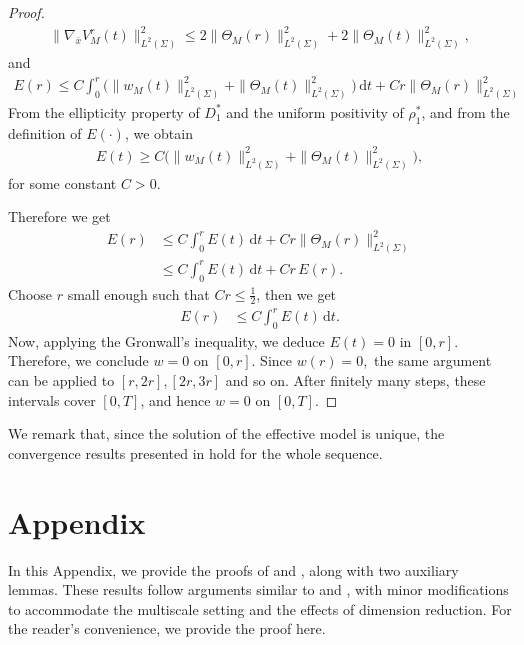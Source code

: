 \documentclass[11pt]{article}
\newcommand{\di}[1]{\,\mathrm{d}#1}
\begin{document}
\begin{proof}
\begin{align*}
    \|\nabla_{\bar x}V_M^r(t)\|_{L^2(\Sigma)}^2\leq 2\|\Theta_M(r)\|_{L^2(\Sigma)}^2+2\|\Theta_M(t)\|_{L^2(\Sigma)}^2,
\end{align*}
and 
\begin{align*}
    E(r)\leq C \int_0^r\Big(\|w_M(t)\|_{L^2(\Sigma)}^2+\|\Theta_M(t)\|_{L^2(\Sigma)}^2\Big)\di{t}+Cr\|\Theta_M(r)\|_{L^2(\Sigma)}^2
\end{align*}
From the ellipticity property of $D_1^*$ and the uniform positivity of $\rho_1^*$, and from the definition of $E(\cdot)$, we obtain
\begin{align*}
    E(t)\geq C\Big(\|w_M(t)\|_{L^2(\Sigma)}^2+\|\Theta_M(t)\|_{L^2(\Sigma)}^2\Big),
\end{align*}
for some constant $C>0.$

Therefore we get
\begin{align*}
    E(r)&\leq C\int_0^rE(t)\di{t}+Cr\|\Theta_M(r)\|_{L^2(\Sigma)}^2\\
    &\leq C\int_0^rE(t)\di{t}+Cr\, E(r).
\end{align*}
Choose $r$ small enough such that $Cr\leq\frac12$, then we get
\begin{align*}
    E(r)&\leq C\int_0^rE(t)\di{t}.
\end{align*}
Now, applying the Gronwall's inequality, we deduce $E(t)=0$ in $[0,r].$ Therefore, we conclude $w=0$ on $[0,r].$ Since $w(r)=0,$ the same argument can be applied to $[r,2r], [2r,3r]$ and so on. After finitely many steps, these intervals cover $[0,T]$, and hence $w=0$ on $[0,T]$.
\end{proof}

We remark that, since the solution of the effective model is unique, the convergence results presented in  hold for the whole sequence.











	\appendix
	\section{Appendix}
    In this Appendix, we provide the proofs of  and , along with two auxiliary lemmas. These results follow arguments similar to \cite[Proposition 4.2]{neuss2007effective} and \cite[Theorem 5.3]{effectiveapratim}, with minor modifications to accommodate the multiscale setting and the effects of dimension reduction.  For the reader’s convenience, we provide the proof here.
\end{document}
